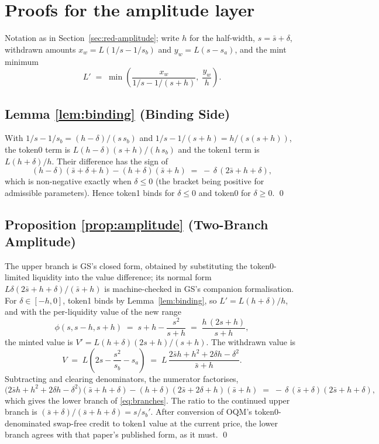 \documentclass[11pt,a4paper]{article}
\theoremstyle{definition}
\theoremstyle{plain}
\theoremstyle{remark}
\begin{document}
\section{Proofs for the amplitude layer}\label{app:amplitude}

Notation as in Section~\ref{sec:red-amplitude}; write $h$ for the half-width, $s = \bar s + \delta$, withdrawn amounts $x_w = L(1/s - 1/s_b)$ and $y_w = L(s - s_a)$, and the mint minimum
\[
L' \;=\; \min\!\left( \frac{x_w}{1/s - 1/(s+h)},\;
\frac{y_w}{h} \right).
\]

\subsection{Lemma \ref{lem:binding} (Binding Side)}

With $1/s - 1/s_b = (h - \delta)/(s\, s_b)$ and $1/s - 1/(s+h) = h/(s(s+h))$, the token0 term is $L (h-\delta)(s+h)/(h\, s_b)$ and the token1 term is $L(h+\delta)/h$. Their difference has the sign of
\[
(h - \delta)(\bar s + \delta + h) - (h + \delta)(\bar s + h)
\;=\; -\,\delta\,(2\bar s + h + \delta),
\]
which is non-negative exactly when $\delta \le 0$ (the bracket being positive for admissible parameters). Hence token1 binds for $\delta\le 0$ and token0 for $\delta \ge 0$. \qed

\subsection{Proposition \ref{prop:amplitude} (Two-Branch Amplitude)}

The upper branch is GS's closed form, obtained by substituting the token0-limited liquidity into the value difference; its normal form $L\delta(2\bar s + h + \delta)/(\bar s + h)$ is machine-checked in
GS's companion formalisation. For $\delta \in [-h, 0]$, token1 binds by Lemma~\ref{lem:binding}, so $L' = L(h+\delta)/h$, and with the per-liquidity value of the new range
\[
\phi(s, s-h, s+h) \;=\; s + h - \frac{s^2}{s+h} \;=\;
\frac{h\,(2s + h)}{s + h},
\]
the minted value is $V' = L (h + \delta)(2s + h)/(s+h)$.
The withdrawn value is
\[
V \;=\; L\left( 2s - \frac{s^2}{s_b} - s_a \right)
\;=\; L\, \frac{2\bar s h + h^2 + 2\delta h - \delta^2}{\bar s + h}.
\]
Subtracting and clearing denominators, the numerator factorises,
\[
\big(2\bar s h + h^2 + 2\delta h - \delta^2\big)(\bar s + h + \delta)
- (h+\delta)(2\bar s + 2\delta + h)(\bar s + h)
\;=\; -\,\delta\, (\bar s + \delta)(2\bar s + h + \delta),
\]
which gives the lower branch of \eqref{eq:branches}. The ratio to the continued upper branch is $(\bar s + \delta)/(\bar s + h + \delta) = s / s_b'$. After conversion of OQM's token0-denominated 
swap-free credit to token1 value at the current price, the lower branch agrees with that paper's published form, as it must. \qed
\end{document}
